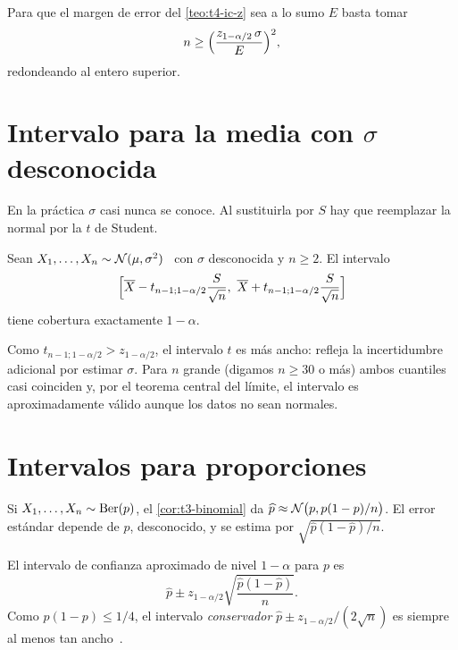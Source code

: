 \begin{corolario}\label{cor:t4-tamano}
Para que el margen de error del \cref{teo:t4-ic-z} sea a lo sumo $E$ basta tomar
\[
n\ge\Bigl(\frac{z_{1-\alpha/2}\,\sigma}{E}\Bigr)^{2},
\]
redondeando al entero superior.
\end{corolario}

\section{Intervalo para la media con \texorpdfstring{$\sigma$}{sigma} desconocida}

En la práctica $\sigma$ casi nunca se conoce. Al sustituirla por $S$ hay que reemplazar la normal por la $t$ de Student.

\begin{teorema}[Intervalo $t$]\label{teo:t4-ic-t}
Sean $X_1,\dots,X_n\sim\mathcal{N}(\mu,\sigma^{2})$ \iid\ con $\sigma$ desconocida y $n\ge2$. El intervalo
\[
\Bigl[\Xbar-t_{n-1;1-\alpha/2}\frac{S}{\sqrt n},\ \Xbar+t_{n-1;1-\alpha/2}\frac{S}{\sqrt n}\Bigr]
\]
tiene cobertura exactamente $1-\alpha$.
\end{teorema}

Como $t_{n-1;1-\alpha/2}>z_{1-\alpha/2}$, el intervalo $t$ es más ancho: refleja la incertidumbre adicional por estimar $\sigma$. Para $n$ grande (digamos $n\ge30$ o más) ambos cuantiles casi coinciden y, por el teorema central del límite, el intervalo es aproximadamente válido aunque los datos no sean normales.

\addtocounter{definicion}{1}%

\section{Intervalos para proporciones}

Si $X_1,\dots,X_n\sim\operatorname{Ber}(p)$, el \cref{cor:t3-binomial} da $\widehat p\approx\mathcal{N}\bigl(p,p(1-p)/n\bigr)$. El error estándar depende de $p$, desconocido, y se estima por $\sqrt{\widehat p(1-\widehat p)/n}$.

\begin{definicion}\label{def:t4-wald}
El intervalo de confianza aproximado de nivel $1-\alpha$ para $p$ es
\[
\widehat p\pm z_{1-\alpha/2}\sqrt{\frac{\widehat p(1-\widehat p)}{n}}.
\]
Como $p(1-p)\le1/4$, el intervalo \emph{conservador} $\widehat p\pm z_{1-\alpha/2}/(2\sqrt n)$ es siempre al menos tan ancho~\cite[§8.3]{openstax}.
\end{definicion}

